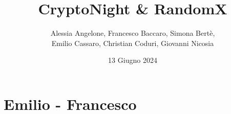 \documentclass{book}
\title{CryptoNight \& RandomX} %
\author{Alessia Angelone, Francesco Baccaro, Simona Bertè, \\ Emilio Cassaro, Christian Coduri, Giovanni Nicosia}
\date{13 Giugno 2024}
\begin{document}
\maketitle
\tableofcontents





\graphicspath{{./bozza/media/}}
\chapter{Emilio - Francesco} %


\graphicspath{{./images/}}






\end{document}
